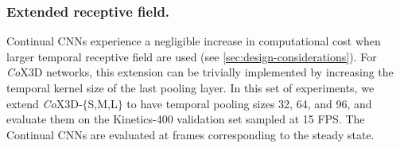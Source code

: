 \vspace{-3mm}
\subsubsection{Extended receptive field.} \label{sec:exp-extended-receptive-fields}
Continual CNNs experience a negligible increase in computational cost when larger temporal receptive field are used (see \cref{sec:design-considerations}). 
For \textit{Co}X3D networks, this extension can be trivially implemented by increasing the temporal kernel size of the last pooling layer.
In this set of experiments, we extend \textit{Co}X3D-$\{\text{S,M,L}\}$ to have temporal pooling sizes 32, 64, and 96, and evaluate them on the Kinetics-400 validation set sampled at 15 FPS.
The Continual CNNs are evaluated at frames corresponding to the steady state.



